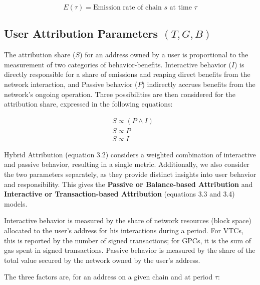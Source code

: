 \documentclass[11pt]{report}
\begin{document}
\begin{equation}
    E(\tau) = \text{Emission rate of chain $s$ at time $\tau$}
    \label{eq:emission_rate}
\end{equation}


\subsection{User Attribution Parameters $(T, G, B)$}

The attribution share ($S$) for an address owned by a user is proportional to the measurement of two categories of behavior-benefits. Interactive behavior ($I$) is directly responsible for a share of emissions and reaping direct benefits from the network interaction, and Passive behavior ($P$) indirectly accrues benefits from the network's ongoing operation. Three possibilities are then considered for the attribution share, expressed in the following equations:

\begin{align}
     & S \propto (P \wedge I) \\
     & S \propto P            \\
     & S \propto I
    \label{eq:attribution_share}
\end{align}

Hybrid Attribution (equation 3.2) considers a weighted combination of interactive and passive behavior, resulting in a single metric. Additionally, we also consider the two parameters separately, as they provide distinct insights into user behavior and responsibility. This gives the \textbf{Passive or Balance-based Attribution} and \textbf{Interactive or Transaction-based Attribution} (equations 3.3 and 3.4) models.

Interactive behavior is measured by the share of network resources (block space) allocated to the user's address for his interactions during a period. For \ac{VTC}s, this is reported by the number of signed transactions; for \ac{GPC}s, it is the sum of gas spent in signed transactions. Passive behavior is measured by the share of the total value secured by the network owned by the user's address.

The three factors are, for an address on a given chain and at period $\tau$:
\end{document}
